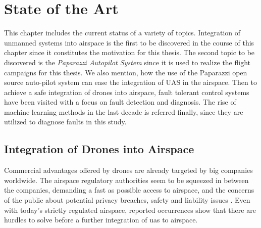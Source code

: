 
{}

\chapter{State of the Art}

This chapter includes the current status of a variety of topics.
Integration of unmanned systems into airspace is the first to be discovered in the course of this chapter since it constitutes the motivation for this thesis.
The second topic to be discovered is the \emph{Paparazzi Autopilot System} since it is used to realize the flight campaigns for this thesis. 
We also mention, how the use of the Paparazzi open source auto-pilot system can ease the integration of UAS in the airspace. 
Then to achieve a safe integration of drones into airspace, fault tolerant control systems have been visited with a focus on fault detection and diagnosis.
The rise of machine learning methods in the last decade is referred finally, since they are utilized to diagnose faults in this study.

\section{Integration of Drones into Airspace}

Commercial advantages offered by drones are already targeted by big companies worldwide. 
The airspace regulatory authorities seem to be squeezed in between the companies, demanding a fast as possible access to airspace, and the concerns of the public about potential privacy breaches, 
safety and liability issues \cite{droneDisasters,droneImageProblem}. 
Even with today's strictly regulated airspace, reported occurrences show that there are hurdles to solve before a further integration of \gls{uas} to airspace.

